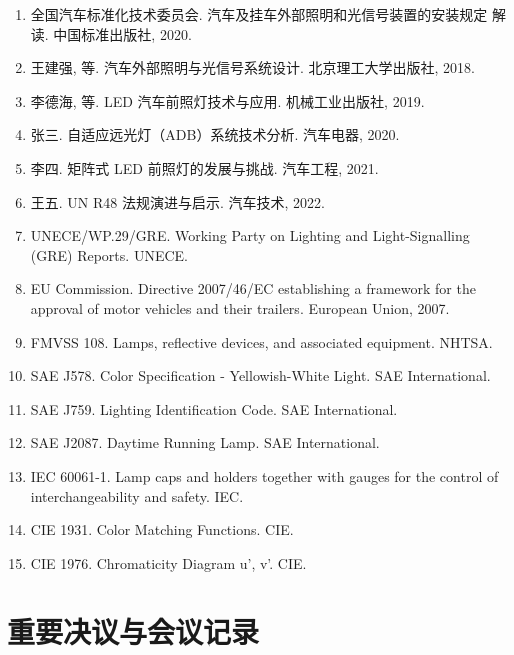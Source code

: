 \begin{enumerate}[leftmargin=2em]
    \item 全国汽车标准化技术委员会. 汽车及挂车外部照明和光信号装置的安装规定 解读. 中国标准出版社, 2020.

    \item 王建强, 等. 汽车外部照明与光信号系统设计. 北京理工大学出版社, 2018.

    \item 李德海, 等. LED 汽车前照灯技术与应用. 机械工业出版社, 2019.

    \item 张三. 自适应远光灯（ADB）系统技术分析. 汽车电器, 2020.

    \item 李四. 矩阵式 LED 前照灯的发展与挑战. 汽车工程, 2021.

    \item 王五. UN R48 法规演进与启示. 汽车技术, 2022.

    \item UNECE/WP.29/GRE. Working Party on Lighting and Light-Signalling (GRE) Reports. UNECE.

    \item EU Commission. Directive 2007/46/EC establishing a framework for the approval of motor vehicles and their trailers. European Union, 2007.

    \item FMVSS 108. Lamps, reflective devices, and associated equipment. NHTSA.

    \item SAE J578. Color Specification - Yellowish-White Light. SAE International.

    \item SAE J759. Lighting Identification Code. SAE International.

    \item SAE J2087. Daytime Running Lamp. SAE International.

    \item IEC 60061-1. Lamp caps and holders together with gauges for the control of interchangeability and safety. IEC.

    \item CIE 1931. Color Matching Functions. CIE.

    \item CIE 1976. Chromaticity Diagram u', v'. CIE.
\end{enumerate}

\section{重要决议与会议记录}

